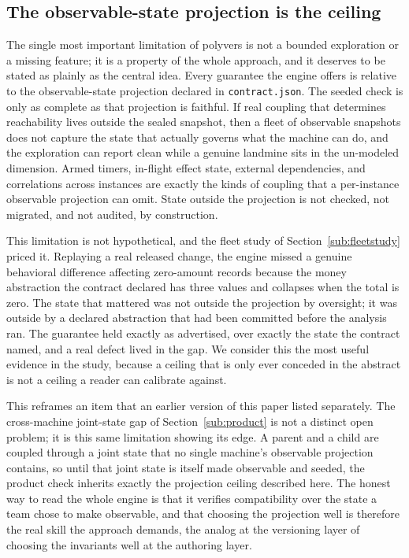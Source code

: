 \documentclass[11pt]{article}
\newcommand{\tool}[1]{\textsf{#1}}
\newcommand{\code}[1]{\texttt{#1}}
\begin{document}
\subsection{The observable-state projection is the ceiling}\label{sub:projection}

The single most important limitation of \tool{polyvers} is not a bounded
exploration or a missing feature; it is a property of the whole approach, and it
deserves to be stated as plainly as the central idea. Every guarantee the engine
offers is relative to the observable-state projection declared in
\code{contract.json}. The seeded check is only as complete as that projection is
faithful. If real coupling that determines reachability lives outside the sealed
snapshot, then a fleet of observable snapshots does not capture the state that
actually governs what the machine can do, and the exploration can report clean
while a genuine landmine sits in the un-modeled dimension. Armed timers,
in-flight effect state, external dependencies, and correlations across instances
are exactly the kinds of coupling that a per-instance observable projection can
omit. State outside the projection is not checked, not migrated, and not
audited, by construction.

This limitation is not hypothetical, and the fleet study of
Section~\ref{sub:fleetstudy} priced it. Replaying a real released change, the
engine missed a genuine behavioral difference affecting zero-amount records
because the money abstraction the contract declared has three values and
collapses when the total is zero. The state that mattered was not outside the
projection by oversight; it was outside by a declared abstraction that had been
committed before the analysis ran. The guarantee held exactly as advertised, over
exactly the state the contract named, and a real defect lived in the gap. We
consider this the most useful evidence in the study, because a ceiling that is
only ever conceded in the abstract is not a ceiling a reader can calibrate
against.

This reframes an item that an earlier version of this paper listed separately.
The cross-machine joint-state gap of Section~\ref{sub:product} is not a distinct open problem;
it is this same limitation showing its edge. A parent and a child are coupled
through a joint state that no single machine's observable projection contains, so
until that joint state is itself made observable and seeded, the product check
inherits exactly the projection ceiling described here. The honest way to read
the whole engine is that it verifies compatibility over the state a team chose to
make observable, and that choosing the projection well is therefore the real
skill the approach demands, the analog at the versioning layer of choosing the
invariants well at the authoring layer.
\end{document}
